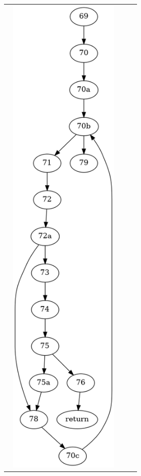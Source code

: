 \documentclass[12pts]{report}
\begin{document}
\begin{figure}
\begin{tabular}{c @{} c @{} c}
\begin{minipage}{0.3\textwidth}
\begin{center}
\includegraphics[width=0.9\textwidth]{images/singleStep-cfg1.png}

\end{center}
\end{minipage}
\end{tabular}
\end{figure}
\end{document}
